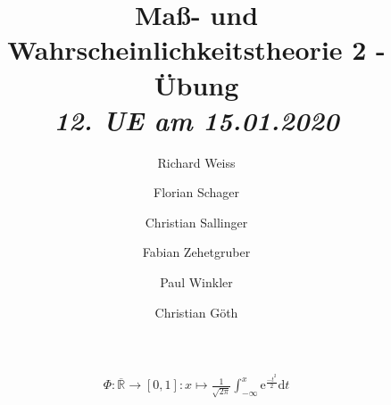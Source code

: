 \documentclass{article}
\title
{
  Maß- und Wahrscheinlichkeitstheorie 2 - Übung \\
  \vspace{4pt}
  \normalsize
  \textit{12. UE am 15.01.2020}
}
\author
{
  Richard Weiss       \and
  Florian Schager     \and
  Christian Sallinger \and
  Fabian Zehetgruber  \and
  Paul Winkler        \and
  Christian Göth
}
\date{}
\begin{document}
\maketitle


\begin{align*}
  \Phi:\overline{\mathbb{R}} \to [0,1]: x \mapsto \frac{1}{\sqrt{2\pi}} \int_{-\infty}^x \mathrm{e}^\frac{-t^2}{2} \mathrm{d}t
\end{align*}







\end{document}
